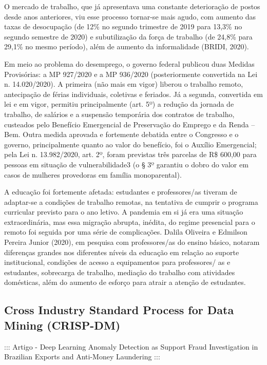 O mercado de trabalho, que já apresentava uma constante deterioração de postos desde anos anteriores, viu esse processo tornar-se mais agudo, com aumento das taxas de desocupação (de 12\% no segundo trimestre de 2019 para 13,3\% no segundo semestre de 2020) e subutilização da força de trabalho (de 24,8\% para 29,1\% no mesmo período), além de aumento da informalidade (BRIDI, 2020). 

Em meio ao problema do desemprego, o governo federal publicou duas Medidas Provisórias: a MP 927/2020 e a MP 936/2020 (posteriormente convertida na Lei n. 14.020/2020). A primeira (não mais em vigor) liberou o trabalho remoto, antecipação de férias individuais, coletivas e feriados. Já a segunda, convertida em lei e em vigor, permitiu principalmente (art. 5º) a redução da jornada de trabalho, de salários e a suspensão temporária dos contratos de trabalho, custeados pelo Benefício Emergencial de Preservação do Emprego e da Renda – Bem. Outra medida aprovada e fortemente debatida entre o Congresso e o governo, principalmente quanto ao valor do benefício, foi o Auxílio Emergencial; pela Lei n. 13.982/2020, art. 2º, foram previstas três parcelas de R\$ 600,00 para pessoas em situação de vulnerabilidade3 (o § 3º garantiu o dobro do valor em casos de mulheres provedoras em família monoparental). 

A educação foi fortemente afetada: estudantes e professores/as tiveram de adaptar-se a condições de trabalho remotas, na tentativa de cumprir o programa curricular previsto para o ano letivo. A pandemia em si já era uma situação extraordinária, mas essa migração abrupta, inédita, do regime presencial para o remoto foi seguida por uma série de complicações. Dalila Oliveira e Edmilson Pereira Junior (2020), em pesquisa com professores/as do ensino básico, notaram diferenças grandes nos diferentes níveis da educação em relação ao suporte institucional, condições de acesso a equipamentos para professores/ as e estudantes, sobrecarga de trabalho, mediação do trabalho com atividades domésticas, além do aumento de esforço para atrair a atenção de estudantes.

\subsection{Cross Industry Standard Process for Data Mining (CRISP-DM)}

::: Artigo - Deep Learning Anomaly Detection as Support Fraud Investigation in Brazilian Exports and Anti-Money Laundering :::

